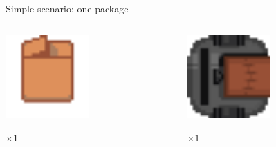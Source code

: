 
\begin{frame}{Simple scenario: one package}
    \centering
    \begin{columns}
        \begin{column}{0.5\textwidth}
            \centering
            \includegraphics[width = 0.5\textwidth]{images/godot/package.png}
            
            \LARGE \emph{$\times 1$}
        \end{column}
        \begin{column}{0.5\textwidth}
            \centering
            \includegraphics[width = 0.5\textwidth]{images/godot/robot_texture.png}
            
            \LARGE \emph{$\times 1$}
        \end{column}
    \end{columns}
\end{frame}

